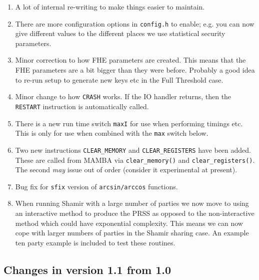 \begin{enumerate}
\item A lot of internal re-writing to make things easier to maintain.
\item There are more configuration options in \verb+config.h+ to enable;
      e.g. you can now give different values to the different places
      we use statistical security parameters.
\item Minor correction to how FHE parameters are created. This means
      that the FHE parameters are a bit bigger than they were before.
      Probably a good idea to re-run setup to generate new keys etc
      in the Full Threshold case.
\item Minor change to how \verb+CRASH+ works. If the IO handler returns,
      then the \verb+RESTART+ instruction is automatically called.
\item There is a new run time switch \verb+maxI+ for use when performing
      timings etc. This is only for use when combined with the \verb+max+
      switch below.
\item Two new instructions \verb+CLEAR_MEMORY+ and \verb+CLEAR_REGISTERS+
      have been added.
      These are called from MAMBA via \verb+clear_memory()+ and \verb+clear_registers()+.
      The second {\em may} issue out of order (consider it experimental at present).
\item Bug fix for \verb+sfix+ version of \verb+arcsin/arccos+ functions.
\item When running Shamir with a large number of parties we now move to using
      an interactive method to produce the PRSS as opposed to the non-interactive
      method which could have exponential complexity. This means we can now cope
      with larger numbers of parties in the Shamir sharing case. An example
      ten party example is included to test these routines.
\end{enumerate}


\subsection{Changes in version 1.1 from 1.0}

